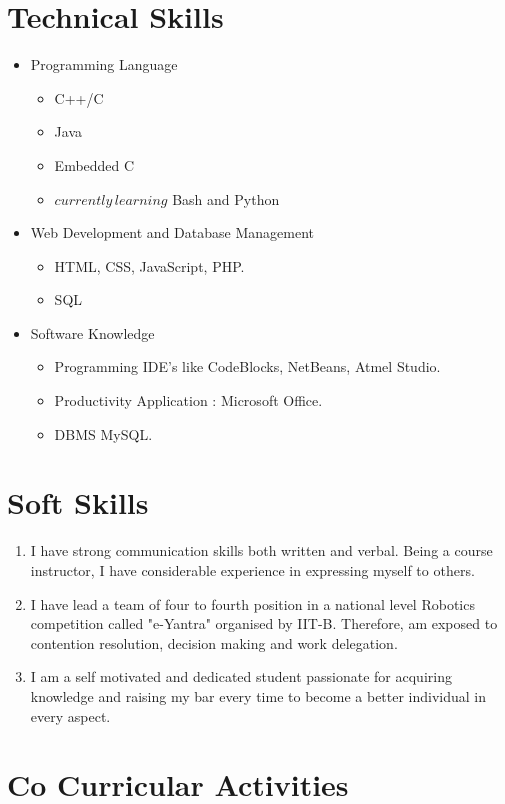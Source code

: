 \documentclass[11pt,a4paper,sans]{moderncv}        %
\begin{document}
\section{Technical Skills}
 \begin{itemize}
 	\item Programming Language 
 	\begin{itemize}
 		\item C++/C
 		\item Java
 		\item Embedded C
 		\item \(currently\, learning\) Bash and Python
 	\end{itemize}
    \item Web Development and Database Management  
    \begin{itemize}
    	\item HTML, CSS, JavaScript, PHP.
    	\item SQL 
    \end{itemize}
 	\item Software Knowledge 
 	\begin{itemize}
 		\item Programming IDE's like CodeBlocks, NetBeans, Atmel Studio.
 		\item Productivity Application : Microsoft Office.
 		\item DBMS MySQL.
 	\end{itemize}
 \end{itemize}

\section{Soft Skills}
\begin{enumerate}
	\item I have strong communication skills both written and verbal.
	      Being a course instructor, I have considerable experience in expressing myself to others.
	\item I have lead a team of four to fourth position in a national level Robotics competition 
	      called "e-Yantra" organised by IIT-B. Therefore, am exposed to contention resolution, decision making
	      and work delegation.
	\item I am a self motivated and dedicated student passionate for acquiring knowledge and raising my bar every time     to become a better individual in every aspect.
\end{enumerate}

\section{Co Curricular Activities}
\end{document}
